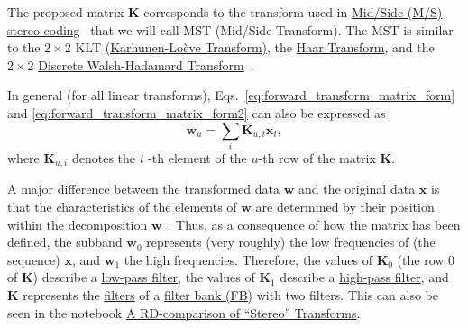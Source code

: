 The proposed matrix ${\mathbf K}$ corresponds to the transform used in
\href{https://en.wikipedia.org/wiki/Joint_encoding#M/S_stereo_coding}{Mid/Side
  (M/S) stereo coding}~\cite{bosi2003intro} that we will call MST
(Mid/Side Transform). The MST is similar to the $2\times 2$ KLT
\href{https://en.wikipedia.org/wiki/Kosambi%E2%80%93Karhunen%E2%80%93Lo%C3%A8ve_theorem}{(Karhunen-Lo\`eve
  Transform)}, the
\href{http://wavelets.pybytes.com/wavelet/haar/}{Haar Transform}, and
the $2\times 2$
\href{https://en.wikipedia.org/wiki/Hadamard_transform}{Discrete
  Walsh-Hadamard
  Transform}~\cite{sayood2017introduction,vetterli1995wavelets}.

In general (for all linear transforms),
Eqs.~\eqref{eq:forward_transform_matrix_form} and
\eqref{eq:forward_transform_matrix_form2} can also be expressed as
\begin{equation}
  {\mathbf w}_u = \sum_i {\mathbf K}_{u,i}{\mathbf x}_i,
  \label{eq:forward_transform_linear_combination_form}
\end{equation}
where ${\mathbf K}_{u,i}$ denotes the $i$ -th element of the $u$-th row of
the matrix ${\mathbf K}$.

A major difference between the transformed data ${\mathbf w}$ and the
original data ${\mathbf x}$ is that the characteristics of the
elements of ${\mathbf w}$ are determined by their position within the
decomposition ${\mathbf w}$~\cite{sayood2017introduction}. Thus, as a
consequence of how the matrix has been defined, the subband ${\mathbf
  w}_0$ represents (very roughly) the low frequencies of (the sequence) ${\mathbf
  x}$, and ${\mathbf w}_1$ the high frequencies. Therefore, the values
of ${\mathbf K}_0$ (the row 0 of ${\mathbf K}$) describe a
\href{https://en.wikipedia.org/wiki/Low-pass_filter}{low-pass filter},
the values of ${\mathbf K}_1$ describe a
\href{https://en.wikipedia.org/wiki/High-pass_filter}{high-pass
  filter}, and ${\mathbf K}$ represents the
\href{https://en.wikipedia.org/wiki/Digital_filter}{filters} of a
\href{https://en.wikipedia.org/wiki/Filter_bank}{filter bank (FB)} with two
filters. This can also be seen in the notebook
\href{https://github.com/Tecnologias-multimedia/Tecnologias-multimedia.github.io/blob/master/contents/transform_coding/stereo_transforms_RD.ipynb}{A RD-comparison of ``Stereo'' Transforms}.

